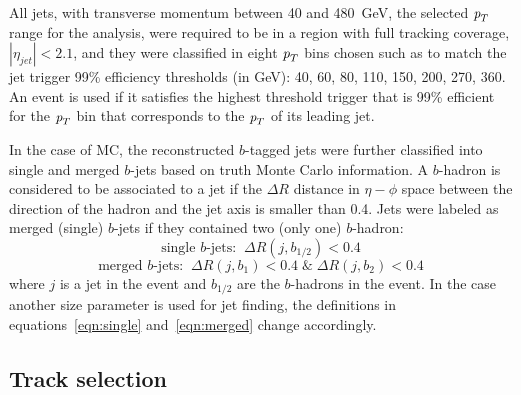 All jets, with transverse momentum between 40 and 480~GeV,  the selected ${\emph{p}_{T}}$ range for the analysis, were required to be in a region with full tracking coverage, $|\eta_{jet}|<2.1$, and they were classified in eight ${\emph{p}_{T}}$ bins chosen such as to match the jet trigger 99\% efficiency thresholds (in GeV): 40, 60, 80, 110, 150, 200, 270, 360. An event is used if it satisfies the highest threshold trigger that is 99\% efficient for the ${\emph{p}_{T}}$ bin that corresponds to the ${\emph{p}_{T}}$ of its leading jet.

In the case of MC, the reconstructed $b$-tagged jets were further classified into single and merged $b$-jets based on truth Monte Carlo information. A $b$-hadron is considered to be associated to a jet if the $\Delta R$ distance in $\eta-\phi$ space between the direction of the hadron and the jet axis is smaller than 0.4. Jets were labeled as merged (single) $b$-jets if they contained two (only one) $b$-hadron:%
\begin{equation}
\mbox{single $b$-jets:} \; \; \Delta R(j,b_{1/2}) < 0.4
\label{eqn:single}
\end{equation}
\begin{equation}
\mbox{merged $b$-jets:}  \; \; \Delta R(j,b_1) < 0.4 \; \& \;  \Delta R(j,b_2) < 0.4
\label{eqn:merged}
\end{equation}
%
where $j$ is a jet in the event and $b_{1/2}$ are the $b$-hadrons in the event. In the case another size parameter is used for jet finding, the definitions in equations~\ref{eqn:single} and~\ref{eqn:merged} change accordingly.


\subsection{Track selection}\label{sec:trackselection}

